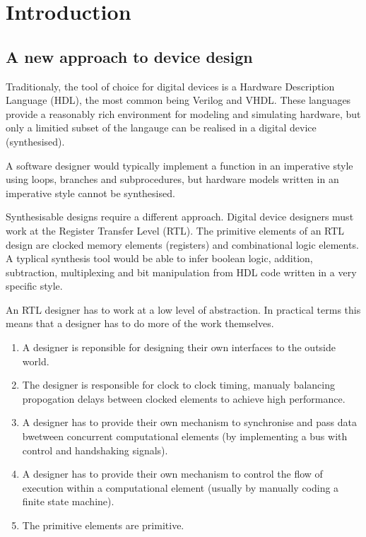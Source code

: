 \chapter{Introduction}
\section{A new approach to device design}

Traditionaly, the tool of choice for digital devices is a Hardware Description
Language (HDL), the most common being Verilog and VHDL. These languages provide
a reasonably rich environment for modeling and simulating hardware,
but only a limitied subset of the langauge can be realised in a digital
device (synthesised). 

A software designer would typically implement a function in an imperative
style using loops, branches and subprocedures, but hardware models written in
an imperative style cannot be synthesised.

Synthesisable designs require a different approach. Digital device designers
must work at the Register Transfer Level (RTL). The primitive elements of an
RTL design are clocked memory elements (registers) and combinational
logic elements. A typlical synthesis tool would be able to infer boolean logic,
addition, subtraction, multiplexing and bit manipulation from HDL code written
in a very specific style.

An RTL designer has to work at a low level of abstraction. In practical terms
this means that a designer has to do more of the work themselves.

\begin{enumerate}

\item
A designer is reponsible for designing their own interfaces to the outside
world.

\item
The designer is responsible for clock to clock timing, manualy balancing
propogation delays between clocked elements to achieve high performance.

\item
A designer has to provide their own mechanism to synchronise and pass
data bwetween concurrent computational elements (by implementing a bus with
control and handshaking signals).

\item
A designer has to provide their own mechanism to control the flow of execution
within a computational element (usually by manually coding a finite state
machine). 

\item
The primitive elements are primitive.

\end{enumerate}

